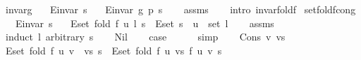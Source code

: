 \begin{isabellebody}
\endisatagproof
{\isafoldproof}%
%
\isadelimproof
%
\endisadelimproof
\isanewline
%
\isadeliminvisible
\isanewline
%
\endisadeliminvisible
%
\isataginvisible
{}\isamarkupfalse%
\ invar{\isacharunderscore}{\kern0pt}g{\isacharcolon}{\kern0pt}\isanewline
\ \ \ {\isachardoublequoteopen}E{\isachardot}{\kern0pt}invar\ s{\isachardoublequoteclose}\isanewline
\ \ \ {\isachardoublequoteopen}E{\isachardot}{\kern0pt}invar\ {\isacharparenleft}{\kern0pt}g\ p\ s{\isacharparenright}{\kern0pt}{\isachardoublequoteclose}%
\endisataginvisible
{\isafoldinvisible}%
%
\isadeliminvisible
%
\endisadeliminvisible
\isanewline
%
\isadelimproof
\ \ %
\endisadelimproof
%
\isatagproof
{}\isamarkupfalse%
\ assms\isanewline
\ \ \isamarkupfalse%
\ {\isacharparenleft}{\kern0pt}intro\ invar{\isacharunderscore}{\kern0pt}fold{\isacharunderscore}{\kern0pt}f{\isacharparenright}{\kern0pt}%
\endisatagproof
{\isafoldproof}%
%
\isadelimproof
%
\endisadelimproof
\isanewline
%
\isadeliminvisible
\isanewline
%
\endisadeliminvisible
%
\isataginvisible
{}\isamarkupfalse%
\ set{\isacharunderscore}{\kern0pt}fold{\isacharunderscore}{\kern0pt}f{\isacharunderscore}{\kern0pt}cong{\isacharcolon}{\kern0pt}\isanewline
\ \ \ {\isachardoublequoteopen}E{\isachardot}{\kern0pt}invar\ s{\isachardoublequoteclose}\isanewline
\ \ \ {\isachardoublequoteopen}E{\isachardot}{\kern0pt}set\ {\isacharparenleft}{\kern0pt}fold\ {\isacharparenleft}{\kern0pt}f\ u{\isacharparenright}{\kern0pt}\ l\ s{\isacharparenright}{\kern0pt}\ {\isacharequal}{\kern0pt}\ E{\isachardot}{\kern0pt}set\ s\ {\isasymunion}\ {\isacharbraceleft}{\kern0pt}u{\isacharbraceright}{\kern0pt}\ {\isasymtimes}\ set\ l{\isachardoublequoteclose}%
\endisataginvisible
{\isafoldinvisible}%
%
\isadeliminvisible
%
\endisadeliminvisible
\isanewline
%
\isadelimproof
\ \ %
\endisadelimproof
%
\isatagproof
{}\isamarkupfalse%
\ assms\isanewline
{}\isamarkupfalse%
\ {\isacharparenleft}{\kern0pt}induct\ l\ arbitrary{\isacharcolon}{\kern0pt}\ s{\isacharparenright}{\kern0pt}\isanewline
\ \ \isamarkupfalse%
\ Nil\isanewline
\ \ \isamarkupfalse%
\ {\isacharquery}{\kern0pt}case\isanewline
\ \ \ \ \isamarkupfalse%
\ simp\isanewline
{}\isamarkupfalse%
\isanewline
\ \ \isamarkupfalse%
\ {\isacharparenleft}{\kern0pt}Cons\ v\ vs{\isacharparenright}{\kern0pt}\isanewline
\ \ \isamarkupfalse%
\ {\isachardoublequoteopen}E{\isachardot}{\kern0pt}set\ {\isacharparenleft}{\kern0pt}fold\ {\isacharparenleft}{\kern0pt}f\ u{\isacharparenright}{\kern0pt}\ {\isacharparenleft}{\kern0pt}v\ {\isacharhash}{\kern0pt}\ vs{\isacharparenright}{\kern0pt}\ s{\isacharparenright}{\kern0pt}\ {\isacharequal}{\kern0pt}\ E{\isachardot}{\kern0pt}set\ {\isacharparenleft}{\kern0pt}fold\ {\isacharparenleft}{\kern0pt}f\ u{\isacharparenright}{\kern0pt}\ vs\ {\isacharparenleft}{\kern0pt}f\ u\ v\ s{\isacharparenright}{\kern0pt}{\isacharparenright}{\kern0pt}{\isachardoublequoteclose}\isanewline

\end{isabellebody}
